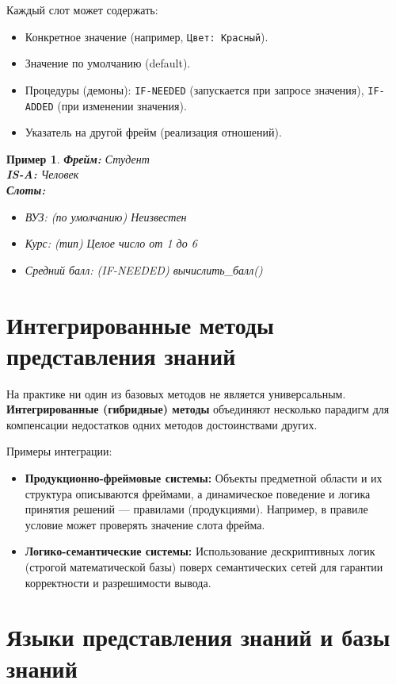 \documentclass[12pt,a4paper]{article}
\newtheorem{example}{Пример}
\begin{document}
Каждый слот может содержать:
\begin{itemize}
    \item Конкретное значение (например, \texttt{Цвет: Красный}).
    \item Значение по умолчанию (default).
    \item Процедуры (демоны): \texttt{IF-NEEDED} (запускается при запросе значения), \texttt{IF-ADDED} (при изменении значения).
    \item Указатель на другой фрейм (реализация отношений).
\end{itemize}

\begin{example}
\textbf{Фрейм:} Студент \\
\textbf{IS-A:} Человек \\
\textbf{Слоты:}
\begin{itemize}
    \item ВУЗ: (по умолчанию) Неизвестен
    \item Курс: (тип) Целое число от 1 до 6
    \item Средний балл: (IF-NEEDED) вычислить\_балл()
\end{itemize}
\end{example}

\section{Интегрированные методы представления знаний}

На практике ни один из базовых методов не является универсальным. \textbf{Интегрированные (гибридные) методы} объединяют несколько парадигм для компенсации недостатков одних методов достоинствами других.

Примеры интеграции:
\begin{itemize}
    \item \textbf{Продукционно-фреймовые системы:} Объекты предметной области и их структура описываются фреймами, а динамическое поведение и логика принятия решений — правилами (продукциями). Например, в правиле условие может проверять значение слота фрейма.
    \item \textbf{Логико-семантические системы:} Использование дескриптивных логик (строгой математической базы) поверх семантических сетей для гарантии корректности и разрешимости вывода.
\end{itemize}

\section{Языки представления знаний и базы знаний}
\end{document}

